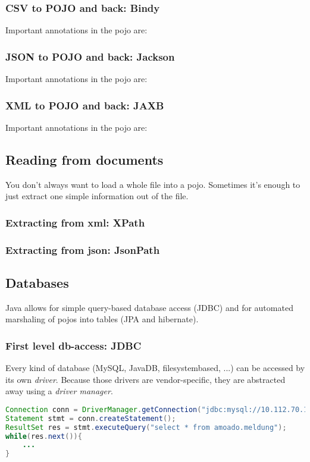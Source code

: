 \subsubsection{CSV to POJO and back: Bindy}
Important annotations in the pojo are: 

\subsubsection{JSON to POJO and back: Jackson}
Important annotations in the pojo are: 

\subsubsection{XML to POJO and back: JAXB}
Important annotations in the pojo are: 


\subsection{Reading from documents}
You don't always want to load a whole file into a pojo. Sometimes it's enough to just extract one simple information out of the file. 

\subsubsection{Extracting from xml: XPath}

\subsubsection{Extracting from json: JsonPath}


\subsection{Databases}
Java allows for simple query-based database access (JDBC) and for automated marshaling of pojos into tables (JPA and hibernate).

\subsubsection{First level db-access: JDBC}

Every kind of database (MySQL, JavaDB, filesystembased, ...) can be accessed by its own \emph{driver}. Because those drivers are vendor-specific, they are abstracted away using a \emph{driver manager}. 

\begin{lstlisting}[language=java]
Connection conn = DriverManager.getConnection("jdbc:mysql://10.112.70.133", "michael", "meinpw");
Statement stmt = conn.createStatement();
ResultSet res = stmt.executeQuery("select * from amoado.meldung");
while(res.next()){
    ...
}
\end{lstlisting}

